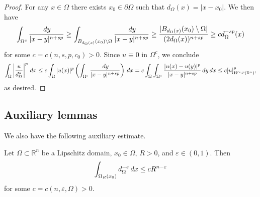 \documentclass[11pt,reqno]{amsart}
\theoremstyle{plain}
\theoremstyle{definition}
\numberwithin{equation}{section}
\newcommand{\R}{\mathbb{R}}
\newcommand{\eps}{\varepsilon}
\newcommand{\1}{\mathbbm{1}}
\renewcommand{\d}{\textnormal{\,d}}
\begin{document}
\begin{proof}
For any $x \in \Omega$ there exists $x_0 \in \partial \Omega$ such that $d_\Omega(x)=|x-x_0|$. We then have
\begin{align*}
    \int_{\Omega^c} \frac{\d y}{|x-y|^{n+sp}} \ge \int_{B_{d_\Omega(x)}(x_0) \setminus \Omega} \frac{\d y}{|x-y|^{n+sp}} \ge \frac{|B_{d_\Omega(x)}(x_0) \setminus \Omega|}{(2d_\Omega(x))^{n+sp}} \ge c d_{\Omega}^{-sp}(x)
\end{align*}
for some $c=c(n, s, p, c_0)>0$. Since $u \equiv 0$ in $\Omega^c$, we conclude
\begin{align*}
    \int_{\Omega} \left| \frac{u}{d_{\Omega}^s} \right|^p \d x \le c\int_{\Omega} |u(x)|^p \left( \int_{\Omega^c} \frac{\d y}{|x-y|^{n+sp}} \right) \d x = c \int_{\Omega} \int_{\Omega^c} \frac{|u(x) - u(y)|^p}{|x-y|^{n+sp}} \d y \d x \le c [u]_{W^{s,p}(\R^n)}^p,
\end{align*}
as desired.
\end{proof}


\subsection{Auxiliary lemmas}

We also have the following auxiliary estimate.


\begin{lemma}
\label{lemma:distance-integral}
Let $\Omega \subset \R^n$ be a Lipschitz domain, $x_0 \in \Omega$, $R > 0$, and $\varepsilon \in (0,1)$. Then
\begin{align*}
    \int_{\Omega_R(x_0)} d_{\Omega}^{-\eps} \d x \le c R^{n -\eps}
\end{align*}
for some $c=c(n,\eps,\Omega)>0$.
\end{lemma}
\end{document}
